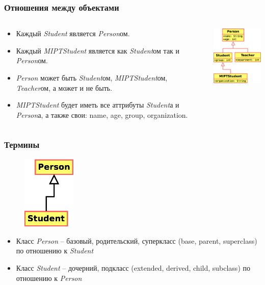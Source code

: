 \begin{frame}
	\frametitle{Отношения между объектами}

	\begin{columns}[c]
	\column{2.8in}
	\begin{large}
	\begin{itemize}
	\item{Каждый \emph{Student} является \emph{Person}ом.}
	\item{Каждый \emph{MIPTStudent} является как \emph{Student}ом так и \emph{Person}ом.}
	\item{\emph{Person} может быть \emph{Student}ом, \emph{MIPTStudent}ом, \emph{Teacher}ом, а может и не быть.}
	\item{\emph{MIPTStudent} будет иметь все аттрибуты \emph{Student}а и \emph{Person}а, а также свои: name, age, group, organization.}
	\end{itemize}
	\end{large}
	\column{1.65in}
	\includegraphics[width=1.7in]{lesson-4-Diagram2.eps}
	\end{columns}
\end{frame}

\begin{frame}
	\frametitle{Термины}

	\begin{figure}[H]
	\centering
	\includegraphics[width=1in]{lesson-4-Diagram3.eps}
	\end{figure}

	\begin{itemize}
	\item{Класс \emph{Person} -- базовый, родительский, суперкласс (base, parent, superclass) по отношению к \emph{Student}}
	\item{Класс \emph{Student} -- дочерний, подкласс (extended, derived, child, subclass) по отношению к \emph{Person}}
	\end{itemize}
\end{frame}


